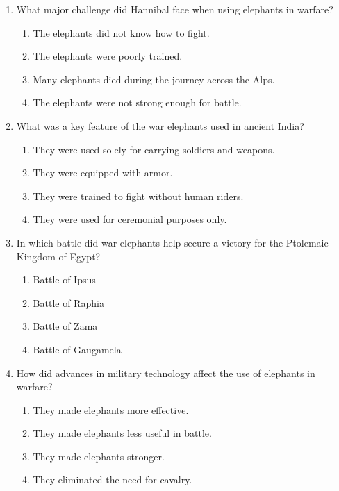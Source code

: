 \documentclass[12pt]{article}
\begin{document}
\begin{enumerate}
    \item What major challenge did Hannibal face when using elephants in warfare?
    \begin{enumerate}[label=\Alph*.]
        \item The elephants did not know how to fight.
        \item The elephants were poorly trained.
        \item Many elephants died during the journey across the Alps.
        \item The elephants were not strong enough for battle.
    \end{enumerate}
    \vspace{0.5cm}

    \item What was a key feature of the war elephants used in ancient India?
    \begin{enumerate}[label=\Alph*.]
        \item They were used solely for carrying soldiers and weapons.
        \item They were equipped with armor.
        \item They were trained to fight without human riders.
        \item They were used for ceremonial purposes only.
    \end{enumerate}
    \vspace{0.5cm}

    \item In which battle did war elephants help secure a victory for the Ptolemaic Kingdom of Egypt?
    \begin{enumerate}[label=\Alph*.]
        \item Battle of Ipsus
        \item Battle of Raphia
        \item Battle of Zama
        \item Battle of Gaugamela
    \end{enumerate}
    \vspace{0.5cm}

    \item How did advances in military technology affect the use of elephants in warfare?
    \begin{enumerate}[label=\Alph*.]
        \item They made elephants more effective.
        \item They made elephants less useful in battle.
        \item They made elephants stronger.
        \item They eliminated the need for cavalry.
    \end{enumerate}
    \vspace{0.5cm}


\end{enumerate}
\end{document}

